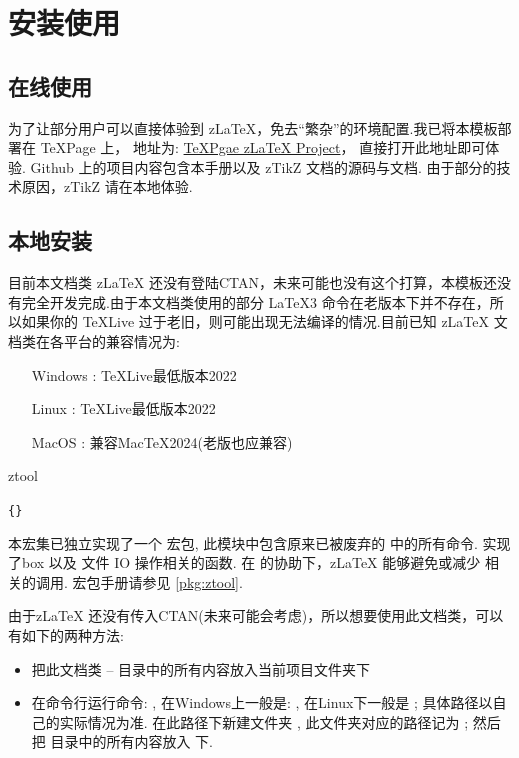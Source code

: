 \documentclass[
  lang=cn, 
  hyper=true,
  class=l3doc, 
]{../code/zlatex}
\newcommand{\zlatex}{z\LaTeX{}}
\newcommand{\zarg}[1]{\texttt{\{}\cmd{#1}\texttt{\}}}
\begin{document}
\section{安装使用}
\subsection{在线使用}
为了让部分用户可以直接体验到 \zlatex{}，免去``繁杂''的环境配置.我已将本模板部署在 \TeX{}Page 上，
地址为: \href{https://www.texpage.com/share/e420ac8364a640b78231d65c9d5d7090}{TeXPgae \zlatex{}  Project}，
直接打开此地址即可体验. Github 上的项目内容包含本手册以及 zTikZ 文档的源码与文档. 由于部分的技术原因，zTikZ 
请在本地体验.

\subsection{本地安装}
目前本文档类 \zlatex{}  还没有登陆CTAN，未来可能也没有这个打算，本模板还没有完全开发完成.由于本文档类使用的部分
\LaTeX3 命令在老版本下并不存在，所以如果你的 \TeX{}Live 过于老旧，则可能出现无法编译的情况.目前已知
\zlatex{} 文档类在各平台的兼容情况为:

\hspace*{10em}\parbox{8cm}{
\begin{itemize}
  \item[Windows]: \TeX{}Live最低版本2022
  \item[Linux]: \TeX{}Live最低版本2022
  \item[MacOS]: 兼容Mac{}\TeX{}2024(老版也应兼容) 
\end{itemize}}

\begin{function}[updated=2024-12-05]{ztool}
  \begin{syntax}
    \zarg{ztool}
  \end{syntax}
  本宏集已独立实现了一个  宏包, 此模块中包含原来已被废弃的  中的所有命令.
   实现了box 以及 文件 IO 操作相关的函数. 在  的协助下，\zlatex{} 能够避免或减少
   相关的调用.  宏包手册请参见 \cref{pkg:ztool}.
\end{function}

由于\zlatex{} 还没有传入CTAN(未来可能会考虑)，所以想要使用此文档类，可以有如下的两种方法:
\begin{itemize}
    \item 把此文档类 --  目录中的所有内容放入当前项目文件夹下
    \item 在命令行运行命令: , 在Windows上一般是: , 在Linux下一般是
      ; 具体路径以自己的实际情况为准. 在此路径下新建文件夹 , 此文件夹对应的路径记为 ; 
      然后把  目录中的所有内容放入  下.
\end{itemize}
\end{document}
